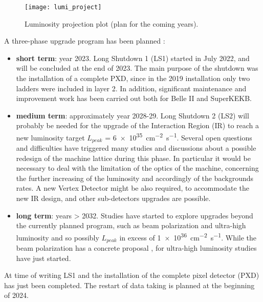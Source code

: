 \begin{figure}
\centering
\texttt{[image: lumi\_project]}
\caption{Luminosity projection plot (plan for the coming years).}
\label{fig:lumy_projection}
\end{figure}


A three-phase upgrade program has been planned \cite{Forti:2022mti}:

\begin{itemize}
\item \textbf{short term}: year 2023. Long Shutdown 1 (LS1) started in July 2022, and will be concluded at the end of 2023. The main purpose of the shutdown was the installation of a complete PXD, since in the 2019 installation only two ladders were included in layer 2. In addition, significant maintenance and improvement work has been carried out both for Belle II and SuperKEKB.
\item \textbf{medium term}: approximately year 2028-29. Long Shutdown 2 (LS2) will probably be needed for the upgrade of the Interaction Region (IR) to reach a new luminosity target $\textit{L}_{peak}$ = \SI{6e35}{cm^{-2}s^{-1}}. 
Several open questions and difficulties have triggered many studies and discussions about a possible redesign of the machine lattice during this phase. In particular it would be necessary to deal with the limitation of the optics of the machine, concerning the further increasing of the luminosity and accordingly of the backgrounds rates. A new Vertex Detector might be also required, to accommodate the new IR design, and other sub-detectors upgrades are possible. 
\item \textbf{long term}: years > 2032. Studies have started to explore upgrades beyond the currently planned program, such as beam polarization and ultra-high luminosity and so possibly $\textit{L}_{peak}$ in excess of \SI{1e36}{cm^{-2}s^{-1}}. While the beam polarization has a concrete proposal \cite{USBelleIIGroup:2022qro, Liptak:2023rvu}, for ultra-high luminosity studies have just started.
\end{itemize}

At time of writing LS1 and the installation of the complete pixel detector (PXD) has just been completed. The restart of data taking is planned at the beginning of 2024.

